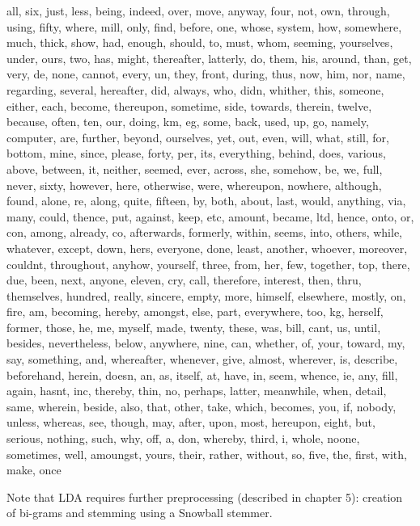 all, six, just, less, being, indeed, over, move, anyway, four, not, own, through, using, fifty, where, mill, only, find, before, one, whose, system, how, somewhere, much, thick, show, had, enough, should, to, must, whom, seeming, yourselves, under, ours, two, has, might, thereafter, latterly, do, them, his, around, than, get, very, de, none, cannot, every, un, they, front, during, thus, now, him, nor, name, regarding, several, hereafter, did, always, who, didn, whither, this, someone, either, each, become, thereupon, sometime, side, towards, therein, twelve, because, often, ten, our, doing, km, eg, some, back, used, up, go, namely, computer, are, further, beyond, ourselves, yet, out, even, will, what, still, for, bottom, mine, since, please, forty, per, its, everything, behind, does, various, above, between, it, neither, seemed, ever, across, she, somehow, be, we, full, never, sixty, however, here, otherwise, were, whereupon, nowhere, although, found, alone, re, along, quite, fifteen, by, both, about, last, would, anything, via, many, could, thence, put, against, keep, etc, amount, became, ltd, hence, onto, or, con, among, already, co, afterwards, formerly, within, seems, into, others, while, whatever, except, down, hers, everyone, done, least, another, whoever, moreover, couldnt, throughout, anyhow, yourself, three, from, her, few, together, top, there, due, been, next, anyone, eleven, cry, call, therefore, interest, then, thru, themselves, hundred, really, sincere, empty, more, himself, elsewhere, mostly, on, fire, am, becoming, hereby, amongst, else, part, everywhere, too, kg, herself, former, those, he, me, myself, made, twenty, these, was, bill, cant, us, until, besides, nevertheless, below, anywhere, nine, can, whether, of, your, toward, my, say, something, and, whereafter, whenever, give, almost, wherever, is, describe, beforehand, herein, doesn, an, as, itself, at, have, in, seem, whence, ie, any, fill, again, hasnt, inc, thereby, thin, no, perhaps, latter, meanwhile, when, detail, same, wherein, beside, also, that, other, take, which, becomes, you, if, nobody, unless, whereas, see, though, may, after, upon, most, hereupon, eight, but, serious, nothing, such, why, off, a, don, whereby, third, i, whole, noone, sometimes, well, amoungst, yours, their, rather, without, so, five, the, first, with, make, once


Note that LDA requires further preprocessing (described in chapter 5): creation of bi-grams and stemming using a Snowball stemmer.

